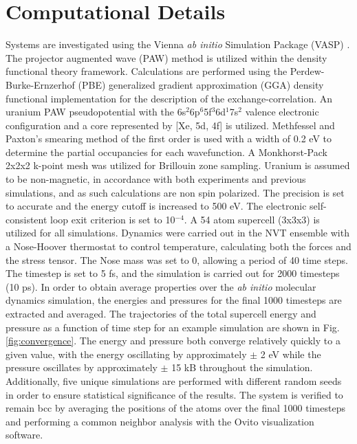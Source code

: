 \documentclass[review]{elsarticle}
\begin{document}
\section{Computational Details}
Systems are investigated using the Vienna \textit{ab initio} Simulation Package (VASP) \cite{vasp1, vasp2, vasp3, vasp4}. The projector augmented wave (PAW) method \cite{paw1, paw2} is utilized within the density functional theory \cite{dft1, dft2} framework. Calculations are performed using the Perdew-Burke-Ernzerhof (PBE) \cite{pbe1, pbe2} generalized gradient approximation (GGA) density functional implementation for the description of the exchange-correlation. An uranium PAW pseudopotential with the 6s$^{2}$6p$^{6}$5f$^{3}$6d$^{1}$7s$^{2}$ valence electronic configuration and a core represented by [Xe, 5d, 4f] is utilized. Methfessel and Paxton's smearing method \cite{methfessel} of the first order is used with a width of 0.2 eV to determine the partial occupancies for each wavefunction. A Monkhorst-Pack \cite{monkhorst} 2x2x2 k-point mesh was utilized for Brillouin zone sampling. Uranium is assumed to be non-magnetic, in accordance with both experiments and previous simulations, and as such calculations are non spin polarized. The precision is set to accurate and the energy cutoff is increased to 500 eV. The electronic self-consistent loop exit criterion is set to 10$^{-4}$.  A 54 atom supercell (3x3x3) is utilized for all simulations. Dynamics were carried out in the NVT ensemble with a Nose-Hoover thermostat to control temperature, calculating both the forces and the stress tensor. The Nose mass was set to 0, allowing a period of 40 time steps. The timestep is set to 5 fs, and the simulation is carried out for 2000 timesteps (10 ps). In order to obtain average properties over the \textit{ab initio} molecular dynamics simulation, the energies and pressures for the final 1000 timesteps are extracted and averaged. The trajectories of the total supercell energy and pressure as a function of time step for an example simulation are shown in Fig. \ref{fig:convergence}. The energy and pressure both converge relatively quickly to a given value, with the energy oscillating by approximately $\pm$ 2 eV while the pressure oscillates by approximately $\pm$ 15 kB throughout the simulation. Additionally, five unique simulations are performed with different random seeds in order to ensure statistical significance of the results. The system is verified to remain bcc by averaging the positions of the atoms over the final 1000 timesteps and performing a common neighbor analysis with the Ovito \cite{ovito} visualization software. 
\end{document}
